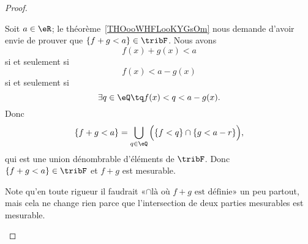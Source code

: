 \begin{proof}
\begin{subproof}
        Soit \( a\in \eR\); le théorème~\ref{THOooWHFLooKYGsOm} nous demande d'avoir envie de prouver que \(  \{ f+g <a\} \in \tribF \). Nous avons
        \begin{equation}
            f(x)+g(x)<a
        \end{equation}
        si et seulement si
        \begin{equation}
            f(x)<a-g(x)
        \end{equation}
        si et seulement si
        \begin{equation}
            \exists q\in \eQ\tq f(x)<q<a-g(x).
        \end{equation}
        Donc
        \begin{equation}
            \{ f+g<a \}=\bigcup_{q\in \eQ}\Big( \{ f<q \}\cap\{ g<a-r \} \Big),
        \end{equation}
        qui est une union dénombrable d'éléments de \( \tribF\). Donc \( \{ f+g<a \}\in \tribF\) et \( f+g\) est mesurable.

        Note qu'en toute rigueur il faudrait  «\( \cap\text{là où } f+g\text{ est définie}\)» un peu partout, mais cela ne change rien parce que l'intersection de deux parties mesurables est mesurable.


\end{subproof}
\end{proof}
